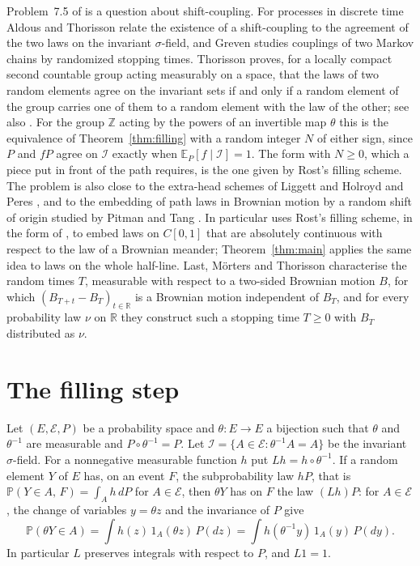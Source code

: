 \documentclass[11pt]{amsart}
\theoremstyle{remark}
\numberwithin{equation}{section}
\newcommand{\E}{\mathbb E}
\newcommand{\Pp}{\mathbb P}
\newcommand{\Z}{\mathbb Z}
\newcommand{\R}{\mathbb R}
\newcommand{\I}{\mathcal I}
\begin{document}
Problem~7.5 of \cite{BS} is a question about shift-coupling. For processes in discrete time Aldous and Thorisson \cite{AT} relate the existence of a shift-coupling to the agreement of the two laws on the invariant $\sigma$-field, and Greven \cite{Gr87} studies couplings of two Markov chains by randomized stopping times. Thorisson \cite{Th96} proves, for a locally compact second countable group acting measurably on a space, that the laws of two random elements agree on the invariant sets if and only if a random element of the group carries one of them to a random element with the law of the other; see also \cite{ThBook}. For the group $\Z$ acting by the powers of an invertible map $\theta$ this is the equivalence of Theorem~\ref{thm:filling} with a random integer $N$ of either sign, since $P$ and $fP$ agree on $\I$ exactly when $\E_P[f\mid\I]=1$. The form with $N\ge0$, which a piece put in front of the path requires, is the one given by Rost's filling scheme. The problem is also close to the extra-head schemes of Liggett \cite{Lig} and Holroyd and Peres \cite{HP}, and to the embedding of path laws in Brownian motion by a random shift of origin studied by Pitman and Tang \cite{PT-patterns,PT-slepian}. In particular \cite[Section~3.5]{PT-patterns} uses Rost's filling scheme, in the form of \cite[Chapter~IX, nos.~63--74]{DM}, to embed laws on $C[0,1]$ that are absolutely continuous with respect to the law of a Brownian meander; Theorem~\ref{thm:main} applies the same idea to laws on the whole half-line. Last, M\"orters and Thorisson \cite{LMT} characterise the random times $T$, measurable with respect to a two-sided Brownian motion $B$, for which $(B_{T+t}-B_T)_{t\in\R}$ is a Brownian motion independent of $B_T$, and for every probability law $\nu$ on $\R$ they construct such a stopping time $T\ge0$ with $B_T$ distributed as $\nu$.

\section{The filling step}\label{sec:filling}

Let $(E,\mathcal E,P)$ be a probability space and $\theta:E\to E$ a bijection such that $\theta$ and $\theta^{-1}$ are measurable and $P\circ\theta^{-1}=P$. Let $\I=\{A\in\mathcal E:\theta^{-1}A=A\}$ be the invariant $\sigma$-field. For a nonnegative measurable function $h$ put $Lh=h\circ\theta^{-1}$. If a random element $Y$ of $E$ has, on an event $F$, the subprobability law $hP$, that is $\Pp(Y\in A,\,F)=\int_A h\,dP$ for $A\in\mathcal E$, then $\theta Y$ has on $F$ the law $(Lh)P$: for $A\in\mathcal E$, the change of variables $y=\theta z$ and the invariance of $P$ give
\begin{equation}\label{eq:push}
\Pp(\theta Y\in A)=\int h(z)\,1_A(\theta z)\,P(dz)=\int h(\theta^{-1}y)\,1_A(y)\,P(dy).
\end{equation}
In particular $L$ preserves integrals with respect to $P$, and $L1=1$.
\end{document}
